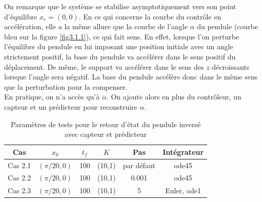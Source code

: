 \documentclass[a4paper]{article}
\begin{document}
                        On remarque que le système se stabilise asymptotiquement vers son point d'équilibre $x_e=(0,0)$.
                        En ce qui concerne la courbe du contrôle en accélération, elle a la même allure que la courbe de l'angle $\alpha$
                        du pendule (courbe bleu sur la figure \ref{fig3.1.1}), ce qui fait sens. 
                        En effet, lorsque l'on perturbe l'équilibre du pendule en lui imposant une position initiale avec un angle strictement positif,
                        la base du pendule va accélérer dans le sens positif du déplacement.
                        De même, le support va accélérer dans le sens des $z$ décroissants lorsque l'angle sera négatif.
                        La base du pendule accélère donc dans le même sens que la perturbation pour la compenser. \\


                        En pratique, on n'a accès qu'à $\dot \alpha$.
                        On ajoute alors en plus du contrôleur, un capteur et un prédicteur pour reconstruire $\alpha$.

                        \begin{table}[h!]
                                \centering
                                \begin{tabular}{|c||c|c|c|c|c|} \hline
                                        \textbf{Cas} & \textbf{$x_0$} & \textbf{$t_f$} & \textbf{$K$} & \textbf{Pas} & \textbf{Intégrateur} \\ \hline
                                        Cas 2.1 & $(\pi/20,0)$ & 100 & (10,1) & par défaut & ode45 \\ \hline
                                        Cas 2.2 & $(\pi/20,0)$ & 100 & (10,1) & 0.001 & ode45 \\ \hline
                                        Cas 2.3 & $(\pi/20,0)$ & 100 & (10,1) & 5 & Euler, ode1 \\ \hline
                                \end{tabular}
                                \label{table2}
                                \caption{Paramètres de tests pour le retour d'état du pendule inversé avec capteur et prédicteur}
                        \end{table}
\end{document}
